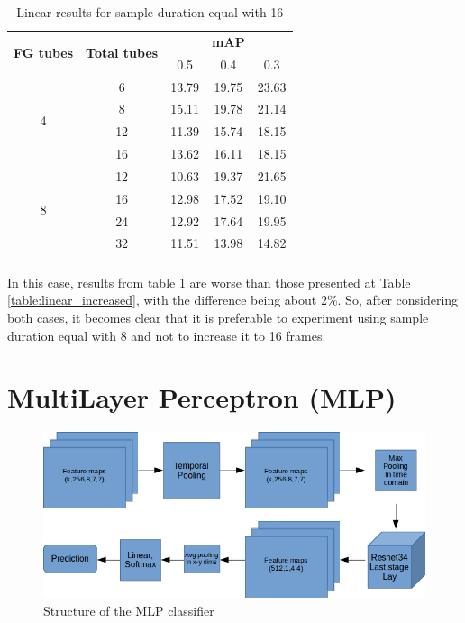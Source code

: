 \documentclass{report}
\begin{document}
\begin{center}
  \begin{longtable}{|| c | c || c c c ||}
    \hline
    \multirow{2}{*}{\textbf{FG tubes}} & \multirow{2}{*}{\textbf{Total tubes}} & {} & \textbf{mAP} & {} \\
    {} & {} & 0.5 & 0.4 & 0.3 \\
    \hline
    \multirow{4}{*}{4} & 6 & 13.79 & 19.75 & 23.63 \\
    \cline{2-5}
    {} & 8 & 15.11 & 19.78 & 21.14 \\
    \cline{2-5}
    {} & 12 & 11.39 & 15.74 & 18.15 \\
    \cline{2-5}
    {} & 16 & 13.62 & 16.11 & 18.15 \\
    \hline
    \multirow{4}{*}{8} & 12 & 10.63 & 19.37 & 21.65 \\
    \cline{2-5}
    {} & 16 & 12.98 & 17.52 & 19.10 \\
    \cline{2-5}
    {} & 24 & 12.92 & 17.64 & 19.95 \\
    \cline{2-5}
    {} & 32 & 11.51 & 13.98 & 14.82 \\
    \hline

  \caption{Linear results for sample duration equal with 16}
  \label{table:linear_16}
\end{longtable}
\end{center}


In this case, results from table \ref{table:linear_16} are worse than  those presented at Table \ref{table:linear_increased}, with the difference being about 2\%.
So, after considering both cases, it becomes clear that it is preferable to experiment using sample duration equal with 8 and not to increase it to 16 frames.


\section{MultiLayer Perceptron (MLP)}

\begin{figure}[h]
  \centering
  \includegraphics[scale=0.42]{mlp}
  \caption{Structure of the MLP classifier}
  \label{fig:mlp_structure}
\end{figure}
\end{document}
